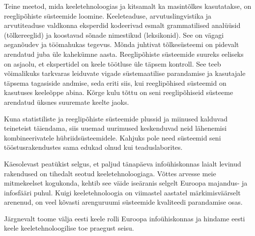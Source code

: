 \begin{multicols}{2}
Teine meetod, mida keeletehnoloogias ja kitsamalt ka masintõlkes kasutatakse, on reeglipõhiste süsteemide loomine. 
Keele\-tea\-duse, arvutuslingvistika ja arvutitea\-duse valdkonna eksperdid kodeerivad esmalt grammatilised analüüsid (tõlke\-reeg\-lid) ja koostavad sõnade nimestikud (leksikonid). 
See on vägagi aeganõudev ja töömahukas tegevus. 
Mõnda juhtivat tõlkesüsteemi on pidevalt arendatud juba üle kahekümne aasta. 
Reeglipõhiste süsteemide suureks eeliseks on asjaolu, et ekspertidel on keele töötluse üle täpsem kontroll. 
See teeb võimalikuks tarkvaras leiduvate vigade süstemaatilise parandamise ja kasutajale täpsema tagasiside andmise, seda eriti siis, kui reeglipõhised süsteemid on kasutuses keeleõppe abina. 
Kõrge kulu tõttu on seni reeglipõhiseid süsteeme arendatud üksnes suuremate keelte jaoks.



Kuna statistiliste ja reeglipõhiste süsteemide plussid ja miinused kalduvad teineteist täiendama, siis uuemad uurimused keskenduvad neid lähenemisi kombineerivatele hübriidsüsteemidele. 
Kahjuks pole need süsteemid seni tööstusrakendustes sama edukad olnud kui teaduslaborites.

Käesolevast peatükist selgus, et paljud tänapäeva infoühiskonnas laialt levinud rakendused on tihedalt seotud keeletehnoloogiaga. 
Võttes arvesse meie mitmekeelset kogukonda, kehtib see väide iseäranis selgelt Euroopa majandus- ja infosfääri puhul. 
Kuigi keeletehnoloogia on viimastel aastatel märkimisväärselt arenenud, on veel kõvasti arenguruumi süsteemide kvaliteedi parandamise osas.

Järgnevalt toome välja eesti keele rolli Euroopa infoühiskonnas ja hindame eesti keele keeletehnoloogilise toe praegust seisu.
\end{multicols}

\clearpage



